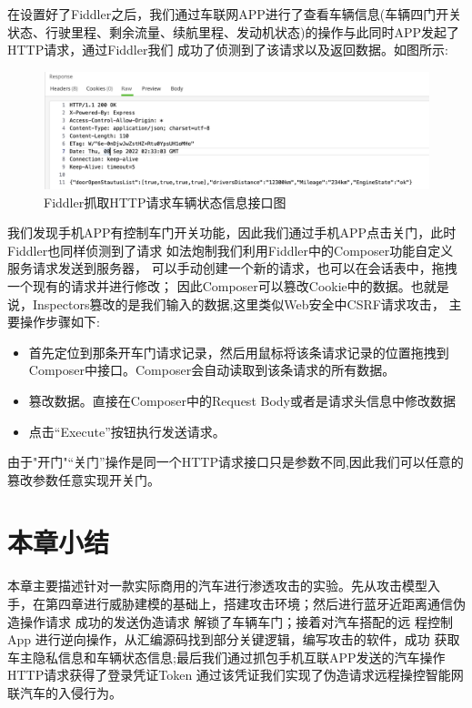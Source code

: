在设置好了Fiddler之后，我们通过车联网APP进行了查看车辆信息(车辆四门开关状态、行驶里程、剩余流量、续航里程、发动机状态)的操作与此同时APP发起了HTTP请求，通过Fiddler我们
成功了侦测到了该请求以及返回数据。如图所示:
\begin{figure}
  \centering
  \includegraphics[scale=0.5]{resources/img/i26.png}
  \caption{Fiddler抓取HTTP请求车辆状态信息接口图}
\end{figure}
我们发现手机APP有控制车门开关功能，因此我们通过手机APP点击关门，此时Fiddler也同样侦测到了请求
如法炮制我们利用Fiddler中的Composer功能自定义服务请求发送到服务器，
可以手动创建一个新的请求，也可以在会话表中，拖拽一个现有的请求并进行修改；
因此Composer可以篡改Cookie中的数据。也就是说，Inspectors篡改的是我们输入的数据,这里类似Web安全中CSRF请求攻击\cite{blatz2007csrf}，
主要操作步骤如下:
\begin{itemize}
  \item 首先定位到那条开车门请求记录，然后用鼠标将该条请求记录的位置拖拽到Composer中接口。Composer会自动读取到该条请求的所有数据。
  \item 篡改数据。直接在Composer中的Request Body或者是请求头信息中修改数据
  \item 点击“Execute”按钮执行发送请求。
\end{itemize}
由于"开门"“关门”操作是同一个HTTP请求接口只是参数不同,因此我们可以任意的篡改参数任意实现开关门。

\section{本章小结}
本章主要描述针对一款实际商用的汽车进行渗透攻击的实验。先从攻击模型入
手，在第四章进行威胁建模的基础上，搭建攻击环境；然后进行蓝牙近距离通信伪造操作请求 成功的发送伪造请求 解锁了车辆车门；接着对汽车搭配的远
程控制 App 进行逆向操作，从汇编源码找到部分关键逻辑，编写攻击的软件，成功
获取车主隐私信息和车辆状态信息;最后我们通过抓包手机互联APP发送的汽车操作HTTP请求获得了登录凭证Token
通过该凭证我们实现了伪造请求远程操控智能网联汽车的入侵行为。
